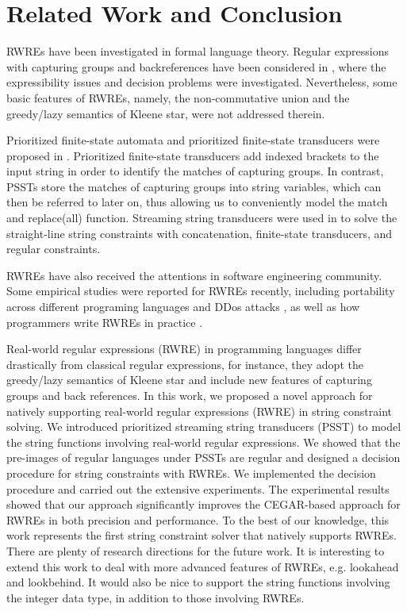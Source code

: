 
\section{Related Work and Conclusion}

RWREs have been investigated in formal language theory. Regular expressions with capturing groups and backreferences have been considered in \cite{CSY03,CN09,Freydenberger13,Schmid16,FS19}, where the expressibility issues and decision problems were investigated. Nevertheless, some basic features of RWREs, namely, the non-commutative union and the greedy/lazy semantics of Kleene star, were not addressed therein.

Prioritized finite-state automata and prioritized finite-state transducers were proposed in \cite{BM17}. Prioritized finite-state transducers add indexed brackets to the input string in order to identify the matches of capturing groups. In contrast, PSSTs store the matches of capturing groups into string variables, which can then be referred to later on, thus allowing us to conveniently model the match and replace(all) function. 
%
Streaming string transducers were used in \cite{ZAM19} to solve the straight-line string constraints with concatenation, finite-state transducers, and regular constraints.

RWREs have also received the attentions in software engineering community. Some empirical studies were reported for RWREs recently, including portability across different programing languages \cite{DMC+19} and DDos attacks \cite{SP18}, as well as how programmers write RWREs in practice \cite{MDD+19}.


Real-world regular expressions (RWRE) in programming languages differ drastically from classical regular expressions, for instance, they adopt the greedy/lazy semantics of Kleene star and include new features of capturing groups and back references. In this work, we proposed a novel approach for natively supporting real-world regular expressions (RWRE) in string constraint solving. We introduced prioritized streaming string transducers (PSST) to  model the string functions involving real-world regular expressions. We showed that the pre-images of regular languages under PSSTs are regular and designed a decision procedure for string constraints with RWREs. We implemented the decision procedure and carried out the extensive experiments. The experimental results showed that our approach significantly improves the CEGAR-based approach for RWREs in both precision and performance. To the best of our knowledge, this work represents the first string constraint solver that natively supports RWREs. There are plenty of research directions for the future work. It is interesting to extend this work to deal with more advanced features of RWREs, e.g. lookahead and lookbehind. It would also be nice to support the string functions involving the integer data type, in addition to those involving RWREs.

